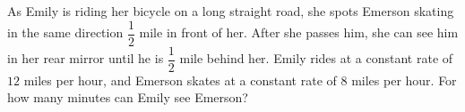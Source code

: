 As Emily is riding her bicycle on a long straight road, she spots Emerson skating in the same direction $\dfrac{1}{2}$ mile in front of her. After she passes him, she can see him in her rear mirror until he is $\dfrac{1}{2}$ mile behind her. Emily rides at a constant rate of $12$ miles per hour, and Emerson skates at a constant rate of $8$ miles per hour. For how many minutes can Emily see Emerson?
